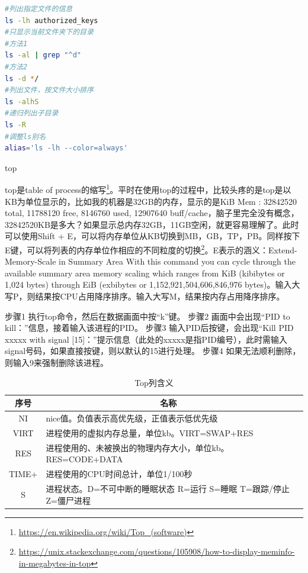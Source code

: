 \documentclass[12pt]{book}
\makeatletter
\numberwithin{dummy}{section}
\theoremstyle{ocrenumbox}
\theoremstyle{blacknumex}
\theoremstyle{blacknumbox}
\theoremstyle{ocrenum}
\renewcommand\paragraph{\@startsection{paragraph}{4}{\z@}
	{-2ex \@plus-.2ex \@minus .2ex}
	{.1ex}
	{\normalfont\small\sffamily\bfseries}}
\makeatother
\begin{document}
\begin{lstlisting}[language=Bash]
#列出指定文件的信息
ls -lh authorized_keys
#只显示当前文件夹下的目录
#方法1
ls -al | grep "^d"
#方法2
ls -d */
#列出文件，按文件大小排序
ls -alhS
#递归列出子目录
ls -R
#调整ls别名
alias='ls -lh --color=always'
\end{lstlisting}

\paragraph{top}

top是table of process的缩写\footnote{\url{https://en.wikipedia.org/wiki/Top_(software)}}。平时在使用top的过程中，比较头疼的是top是以KB为单位显示的，比如我的机器是32GB的内存，显示的是KiB Mem : 32842520 total, 11788120 free,  8146760 used, 12907640 buff/cache，脑子里完全没有概念，32842520KB是多大？如果显示总内存32GB，11GB空闲，就更容易理解了。此时可以使用Shift + E，可以将内存单位从KB切换到MB，GB，TP，PB。同样按下E键，可以将列表的内存单位作相应的不同粒度的切换\footnote{\url{https://unix.stackexchange.com/questions/105908/how-to-display-meminfo-in-megabytes-in-top}}。E表示的涵义：Extend-Memory-Scale in Summary Area With this command you can cycle through the available summary area memory scaling which ranges from KiB (kibibytes or 1,024 bytes) through EiB (exbibytes or 1,152,921,504,606,846,976 bytes)。输入大写P，则结果按CPU占用降序排序。输入大写M，结果按内存占用降序排序。

步骤1 执行top命令，然后在数据画面中按“k”键。
步骤2 画面中会出现“PID to kill：”信息，接着输入该进程的PID。
步骤3 输入PID后按键，会出现“Kill PID xxxxx with signal [15]：”提示信息（此处的xxxxx是指PID编号），此时需输入signal号码，如果直接按键，则以默认的15进行处理。
步骤4 如果无法顺利删除，则输入9来强制删除该进程。

\begin{table}
	\caption{Top列含义}
	\label{table:topcolumns}
	\begin{center}
	\begin{tabular}{cp{10cm}c}
		\hline
		\multirow{1}{*}{序号}
		& \multicolumn{1}{c}{名称}  \\
		\hline			
		NI & nice值。负值表示高优先级，正值表示低优先级 \\
		\hline	
		VIRT & 进程使用的虚拟内存总量，单位kb。VIRT=SWAP+RES \\
		\hline
		RES & 进程使用的、未被换出的物理内存大小，单位kb。RES=CODE+DATA \\
		\hline
		TIME+ & 进程使用的CPU时间总计，单位1/100秒 \\
		\hline
		S & 进程状态。D=不可中断的睡眠状态 R=运行 S=睡眠 T=跟踪/停止 Z=僵尸进程 \\
		\hline		
	\end{tabular}	
	\end{center}
\end{table}
\end{document}
